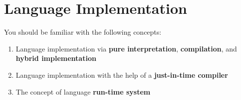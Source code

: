 \section{Language Implementation}\label{sec:Language_Implementation}
You should be familiar with the following concepts:
\begin{enumerate}[noitemsep]
\item Language implementation via \textbf{pure interpretation}, \textbf{compilation}, and \textbf{hybrid implementation}
\item Language implementation with the help of a \textbf{just-in-time compiler}
\item The concept of language \textbf{run-time system}
\end{enumerate}

